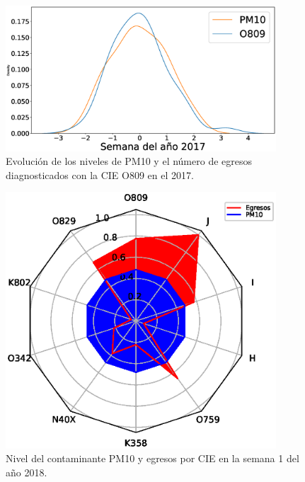 \documentclass[a0]{sciposter} %
\begin{document}
\begin{multicols}{3}
\begin{figure}[h!]
\setcounter{figure}{0} %
\captionsetup{type=figure} %
\begin{center}
   \includegraphics[trim=60 0 0 0,clip,width=0.9\textwidth]{PM10_O809_2017.eps}
   \end{center}
    \caption{Evolución de los niveles de PM10 y el número de egresos diagnosticados con la CIE O809 en el 2017.}
    \label{serie_de_tiempo_2017_PM10}
\end{figure}

\begin{figure}[h!]
\setcounter{figure}{1} %
\captionsetup{type=figure} %
\begin{center}
   \includegraphics[trim=0 0 0 39,clip,width=0.9\textwidth]{spiderweb_PM10_2018_1.eps}
   \end{center}
    \caption{Nivel del contaminante PM10 y egresos por CIE en la semana 1 del año 2018.}
    \label{grafico_de_telaraña}
\end{figure}


\end{multicols}
\end{document}

